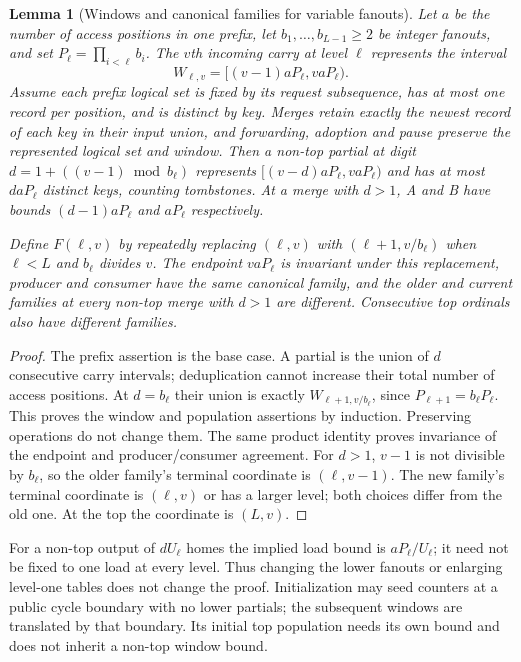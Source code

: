 \documentclass[11pt]{article}
\newtheorem{lemma}[theorem]{Lemma}
\theoremstyle{definition}
\theoremstyle{remark}
\begin{document}
\begin{lemma}[Windows and canonical families for variable fanouts]
\label{lem:window-family}
Let $a$ be the number of access positions in one prefix, let
$b_1,\ldots,b_{L-1}\ge2$ be integer fanouts, and set
$P_\ell=\prod_{i<\ell}b_i$. The $v$th incoming carry at level $\ell$
represents the interval
\[
 W_{\ell,v}=[(v-1)aP_\ell,vaP_\ell).
\]
Assume each prefix logical set is fixed by its request subsequence, has
at most one record per position, and is distinct by key. Merges retain
exactly the newest record of each key in their input union, and forwarding,
adoption and pause preserve the represented logical set and window.
Then a non-top partial at digit $d=1+((v-1)\bmod b_\ell)$ represents
$[(v-d)aP_\ell,vaP_\ell)$ and has at most $daP_\ell$ distinct keys,
counting tombstones. At a merge with $d>1$, A and B have bounds
$(d-1)aP_\ell$ and $aP_\ell$ respectively.

Define $F(\ell,v)$ by repeatedly replacing $(\ell,v)$ with
$(\ell+1,v/b_\ell)$ when $\ell<L$ and $b_\ell$ divides $v$.
The endpoint $vaP_\ell$ is invariant under this replacement, producer
and consumer have the same canonical family, and the older and current
families at every non-top merge with $d>1$ are different. Consecutive top
ordinals also have different families.
\end{lemma}
\begin{proof}
The prefix assertion is the base case. A partial is the union of $d$
consecutive carry intervals; deduplication cannot increase their total
number of access positions. At $d=b_\ell$ their union is exactly
$W_{\ell+1,v/b_\ell}$, since $P_{\ell+1}=b_\ell P_\ell$.
This proves the window and population assertions by induction. Preserving
operations do not change them. The same product identity proves invariance of the endpoint
and producer/consumer agreement. For $d>1$, $v-1$ is not divisible by
$b_\ell$, so the older family's terminal coordinate is $(\ell,v-1)$.
The new family's terminal coordinate is $(\ell,v)$ or has a larger level;
both choices differ from the old one. At the top the coordinate is $(L,v)$.
\end{proof}
For a non-top output of $dU_\ell$ homes the implied load bound is
$aP_\ell/U_\ell$; it need not be fixed to one load at every level.
Thus changing the lower fanouts or enlarging level-one tables does not
change the proof. Initialization may seed counters at a public cycle
boundary with no lower partials; the subsequent windows are translated by
that boundary. Its initial top population needs its own bound and does not
inherit a non-top window bound.
\end{document}
